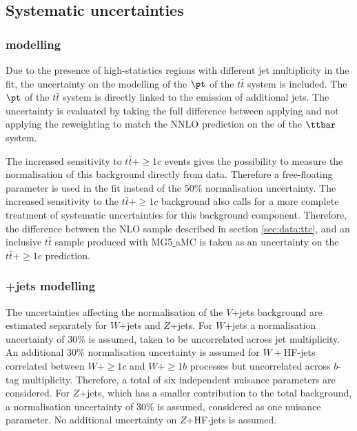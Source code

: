 \subsection{Systematic uncertainties}
\label{sec:tth:systunc}

\subsubsection[$t\bar{t}$ modelling]{ modelling}
Due to the presence of high-statistics regions with different jet multiplicity in the fit, the uncertainty on the modelling of the $\pt$ of the $t\bar{t}$ system is included. The $\pt$ of the $t\bar{t}$ system is directly linked to the emission of additional jets. The uncertainty is evaluated by taking the full difference between applying and not applying the reweighting to match the NNLO prediction on the \pt of the $\ttbar$ system.\par
The increased sensitivity to $t\bar{t}+\ge1c$ events gives the possibility to measure the normalisation of this background directly from data. Therefore a free-floating parameter is used in the fit instead of the $50\%$ normalisation uncertainty. The increased sensitivity to the $t\bar{t}+\ge1c$ background also calls for a more complete treatment of systematic uncertainties for this background component. Therefore, the difference between the NLO sample described in section \ref{sec:data:ttc}, and an inclusive $t\bar{t}$ sample produced with {\sc MG5$\_$aMC} is taken as an uncertainty on the $t\bar{t}+\ge1c$  prediction.

\subsubsection[$W/Z$+jets modelling]{+jets modelling}
The uncertainties affecting the normalisation of the $V$+jets background are estimated separately for $W$+jets and $Z$+jets. For $W$+jets a normalisation uncertainty of $30\%$ is assumed, taken to be uncorrelated across jet multiplicity. An additional $30\%$ normalisation uncertainty is assumed for $W+$HF-jets correlated between $W+\ge1c$  and $W+\ge1b$ processes but uncorrelated across $b$-tag multiplicity. Therefore, a total of six independent nuisance parameters are considered.
For $Z$+jets, which has a smaller contribution to the total background, a normalisation uncertainty of $30\%$ is assumed, considered as one nuisance parameter. No additional uncertainty on $Z$+HF-jets is assumed.

